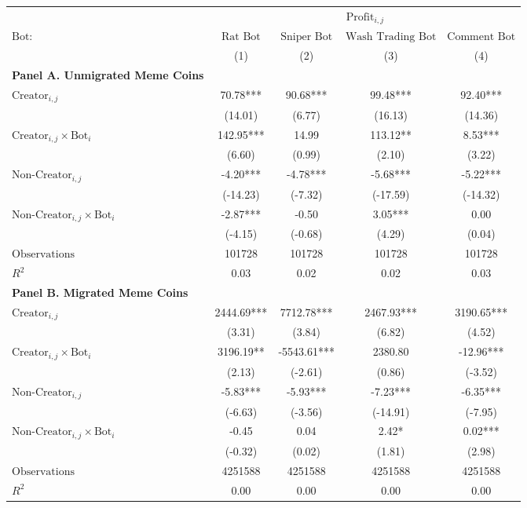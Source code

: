 \begin{tabular}{lcccc}
\toprule
 & \multicolumn{4}{c}{$\text{Profit}_{i,j}$} \\
\cline{2-5}
 $\text{Bot}:$ & $\text{Rat Bot}$ & $\text{Sniper Bot}$ & $\text{Wash Trading Bot}$ & $\text{Comment Bot}$ \\
 & (1) & (2) & (3) & (4)\\
\midrule
\textbf{Panel A. Unmigrated Meme Coins}\\
\midrule
$\text{Creator}_{i,j}$ & 70.78*** & 90.68*** & 99.48*** & 92.40*** \\
 & (14.01) & (6.77) & (16.13) & (14.36) \\
$\text{Creator}_{i,j} \times \text{Bot}_i$ & 142.95*** & 14.99 & 113.12** & 8.53*** \\
 & (6.60) & (0.99) & (2.10) & (3.22) \\
$\text{Non-Creator}_{i,j}$ & -4.20*** & -4.78*** & -5.68*** & -5.22*** \\
 & (-14.23) & (-7.32) & (-17.59) & (-14.32) \\
$\text{Non-Creator}_{i,j} \times \text{Bot}_i$ & -2.87*** & -0.50 & 3.05*** & 0.00 \\
 & (-4.15) & (-0.68) & (4.29) & (0.04) \\
\midrule
$\text{Observations}$ & 101728 & 101728 & 101728 & 101728 \\
$R^2$ & 0.03 & 0.02 & 0.02 & 0.03 \\
\midrule
\textbf{Panel B. Migrated Meme Coins}\\
\midrule
$\text{Creator}_{i,j}$ & 2444.69*** & 7712.78*** & 2467.93*** & 3190.65*** \\
 & (3.31) & (3.84) & (6.82) & (4.52) \\
$\text{Creator}_{i,j} \times \text{Bot}_i$ & 3196.19** & -5543.61*** & 2380.80 & -12.96*** \\
 & (2.13) & (-2.61) & (0.86) & (-3.52) \\
$\text{Non-Creator}_{i,j}$ & -5.83*** & -5.93*** & -7.23*** & -6.35*** \\
 & (-6.63) & (-3.56) & (-14.91) & (-7.95) \\
$\text{Non-Creator}_{i,j} \times \text{Bot}_i$ & -0.45 & 0.04 & 2.42* & 0.02*** \\
 & (-0.32) & (0.02) & (1.81) & (2.98) \\
\midrule
$\text{Observations}$ & 4251588 & 4251588 & 4251588 & 4251588 \\
$R^2$ & 0.00 & 0.00 & 0.00 & 0.00 \\
\bottomrule
\end{tabular}
